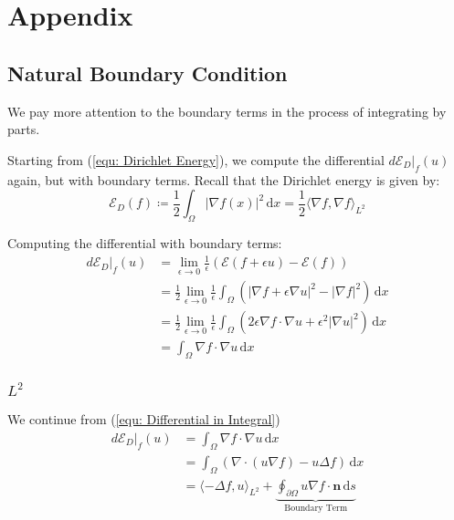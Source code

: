 \documentclass[a4paper]{article}
\newcommand{\dx}{\, \text{d} x}
\newcommand{\ds}{\, \text{d} s}
\theoremstyle{definition}
\begin{document}
\newpage
\section{Appendix}
\subsection{Natural Boundary Condition}
\label{sct: Natural Boundary Condition}
We pay more attention to the boundary terms in the process of integrating by parts.

Starting from (\ref{equ: Dirichlet Energy}), we compute the differential $d \mathcal{E}_D |_f (u)$ again, but with boundary terms.
Recall that the Dirichlet energy is given by:
\begin{equation*}
    \mathcal{E}_D (f) \coloneqq \frac{1}{2} \int_{\Omega} |\nabla f(x)|^2 \dx = \frac{1}{2} \langle \nabla f, \nabla f \rangle_{L^2}
\end{equation*}

Computing the differential with boundary terms:
\begin{align}
    d \mathcal{E}_D|_f(u) &= \lim_{\epsilon \rightarrow 0}\frac{1}{\epsilon} \left( \mathcal{E}(f+\epsilon u) - \mathcal{E}(f) \right) \\
    &= \frac{1}{2} \lim_{\epsilon \rightarrow 0} \frac{1}{\epsilon} \int_{\Omega} \left( |\nabla f + \epsilon \nabla u|^2 - |\nabla f|^2 \right) \dx \\
    &= \frac{1}{2} \lim_{\epsilon \rightarrow 0} \frac{1}{\epsilon} \int_{\Omega} \left( 2\epsilon \nabla f \cdot \nabla u + \epsilon^2 |\nabla u|^2 \right) \dx \\
    &= \int_{\Omega} \nabla f \cdot \nabla u \dx
    \label{equ: Differential in Integral}
\end{align}

\subsubsection{$L^2$}
\label{sct: L2 Natural BC}
We continue from (\ref{equ: Differential in Integral})
\begin{align}
    d \mathcal{E}_D|_f(u) &= \int_{\Omega} \nabla f \cdot \nabla u \dx \\
    &= \int_{\Omega} \left( \nabla \cdot \left( u \nabla f \right) - u \Delta f \right) \dx \\
    &= \langle -\Delta f, u \rangle_{L^2} + \underbrace{\oint_{\partial \Omega} u \nabla f \cdot \mathbf{n} \ds}_{\text{Boundary Term}}
    \label{equ: L2 Natural Boundary}
\end{align}
\end{document}
